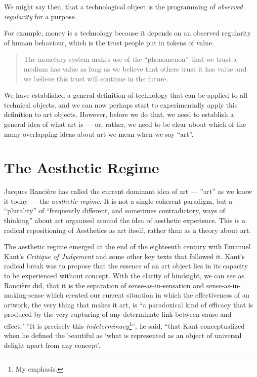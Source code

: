 \documentclass[letterpaper]{article}
\begin{document}
    We might say then, that a technological object is the programming of \emph{observed regularity} for a purpose.

    For example, money is a technology because it depends on an observed regularity of human behaviour, which is the trust people put in tokens of value.

    \begin{quote}
        The monetary system makes use of the “phenomenon” that we trust a medium has value as long as we believe that others trust it has value and we believe this trust will continue in the future. \citep[p.55]{theNatureOfTechnology2009}
    \end{quote}

    We have established a general definition of technology that can be applied to all technical objects, and we can now perhaps start to experimentally apply this definition to art objects. However, before we do that, we need to establish a general idea of what art is — or, rather, we need to be clear about which of the many overlapping ideas about art we mean when we say “art”.

\section{The Aesthetic Regime}

    Jacques Rancière has called the current dominant idea of art — ”art” as we know it today — the \emph{aesthetic regime}. It is not a single coherent paradigm, but a “plurality” of “frequently different, and sometimes contradictory, ways of thinking” \citep[p.8]{RanciereMdrnTms2022} about art organised around the idea of aesthetic experience. This is a radical repositioning of Aesthetics as art itself, rather than as a theory about art.
    
    The aesthetic regime emerged at the end of the eighteenth century with Emanuel Kant's \emph{Critique of Judgement} and some other key texts that followed it. Kant's radical break was to propose that the essence of an art object lies in its capacity to be experienced without concept. With the clarity of hindsight, we can see as Rancière did, that it is the separation of sense-as-in-sensation and sense-as-in-making-sense which created our current situation in which the effectiveness of an artwork, the very thing that makes it art, is “a paradoxical kind of efficacy that is produced by the very rupturing of any determinate link between cause and effect.” \citep[p.51]{RancierThEmncptdSpcttr2009} ”It is precisely this \emph{indeterminacy}\footnote{
        My emphasis.
    }”, he said, “that Kant conceptualized when he defined the beautiful as ‘what is represented as an object of universal delight apart from any concept’. \citep[p.52]{RancierThEmncptdSpcttr2009}
\end{document}
